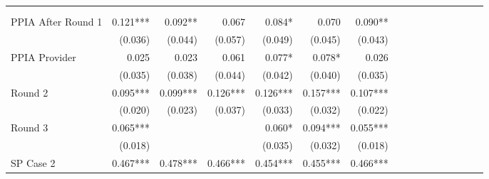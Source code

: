 \begin{tabular}{@{\extracolsep{5pt}}lrrrrrrrrrrrrrrr}
\toprule
& \multicolumn{1}{p{0.13\linewidth}}{\centering{(1)}} & \multicolumn{1}{p{0.13\linewidth}}{\centering{(2)}} & \multicolumn{1}{p{0.13\linewidth}}{\centering{(3)}} & \multicolumn{1}{p{0.13\linewidth}}{\centering{(4)}} & \multicolumn{1}{p{0.13\linewidth}}{\centering{(5)}} & \multicolumn{1}{p{0.13\linewidth}}{\centering{(6)}} \\
& \multicolumn{1}{p{0.13\linewidth}}{\centering{Pooled}} & \multicolumn{1}{p{0.13\linewidth}}{\centering{Diff$-$Diff}} & \multicolumn{1}{p{0.13\linewidth}}{\centering{Sample 1a (Diff$-$Diff)}} & \multicolumn{1}{p{0.13\linewidth}}{\centering{Sample 1a (All)}} & \multicolumn{1}{p{0.13\linewidth}}{\centering{Restricted}} & \multicolumn{1}{p{0.13\linewidth}}{\centering{Separate}} \\
\hline
PPIA After Round 1 & 0.121\phantom{)}*** & 0.092\phantom{)}**\phantom{*} & 0.067\phantom{\phantom{)}***} & 0.084\phantom{)}*\phantom{**} & 0.070\phantom{\phantom{)}***} & 0.090\phantom{)}**\phantom{*} \\
& (0.036)\phantom{***} & (0.044)\phantom{***} & (0.057)\phantom{***} & (0.049)\phantom{***} & (0.045)\phantom{***} & (0.043)\phantom{***} \\
PPIA Provider & 0.025\phantom{\phantom{)}***} & 0.023\phantom{\phantom{)}***} & 0.061\phantom{\phantom{)}***} & 0.077\phantom{)}*\phantom{**} & 0.078\phantom{)}*\phantom{**} & 0.026\phantom{\phantom{)}***} \\
& (0.035)\phantom{***} & (0.038)\phantom{***} & (0.044)\phantom{***} & (0.042)\phantom{***} & (0.040)\phantom{***} & (0.035)\phantom{***} \\
Round 2 & 0.095\phantom{)}*** & 0.099\phantom{)}*** & 0.126\phantom{)}*** & 0.126\phantom{)}*** & 0.157\phantom{)}*** & 0.107\phantom{)}*** \\
& (0.020)\phantom{***} & (0.023)\phantom{***} & (0.037)\phantom{***} & (0.033)\phantom{***} & (0.032)\phantom{***} & (0.022)\phantom{***} \\
Round 3 & 0.065\phantom{)}*** & \phantom{***} & \phantom{***} & 0.060\phantom{)}*\phantom{**} & 0.094\phantom{)}*** & 0.055\phantom{)}*** \\
& (0.018)\phantom{***} & \phantom{***} & \phantom{***} & (0.035)\phantom{***} & (0.032)\phantom{***} & (0.018)\phantom{***} \\
SP Case 2 & 0.467\phantom{)}*** & 0.478\phantom{)}*** & 0.466\phantom{)}*** & 0.454\phantom{)}*** & 0.455\phantom{)}*** & 0.466\phantom{)}*** \\

\end{tabular}
